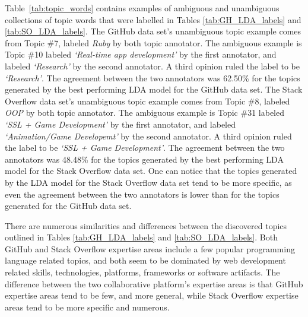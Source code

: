             Table~\ref{tab:topic_words} contains examples of ambiguous and unambiguous collections of topic words that were labelled in Tables \ref{tab:GH_LDA_labels} and \ref{tab:SO_LDA_labels}. The GitHub data set's unambiguous topic example comes from Topic \#7, labeled \emph{Ruby} by both topic annotator. The ambiguous example is Topic \#10 labeled \emph{`Real-time app development'} by the first annotator, and labeled \emph{`Research'} by the second annotator. A third opinion ruled the label to be \emph{`Research'}. The agreement between the two annotators was 62.50\% for the topics generated by the best performing LDA model for the GitHub data set. The Stack Overflow data set's unambiguous topic example comes from Topic \#8, labeled \emph{OOP} by both topic annotator. The ambiguous example is Topic \#31 labeled \emph{`SSL + Game Development'} by the first annotator, and labeled \emph{`Animation/Game Developemt'} by the second annotator. A third opinion ruled the label to be \emph{`SSL + Game Development'}. The agreement between the two annotators was 48.48\% for the topics generated by the best performing LDA model for the Stack Overflow data set. One can notice that the topics generated by the LDA model for the Stack Overflow data set tend to be more specific, as even the agreement between the two annotators is lower than for the topics generated for the GitHub data set.
            
            There are numerous similarities and differences between the discovered topics outlined in Tables \ref{tab:GH_LDA_labels} and \ref{tab:SO_LDA_labels}. Both GitHub and Stack Overflow expertise areas include a few popular programming language related topics, and both seem to be dominated by web development related skills, technologies, platforms, frameworks or software artifacts. The difference between the two collaborative platform's expertise areas is that GitHub expertise areas tend to be few, and more general, while Stack Overflow expertise areas tend to be more specific and numerous.  \\
        
    
